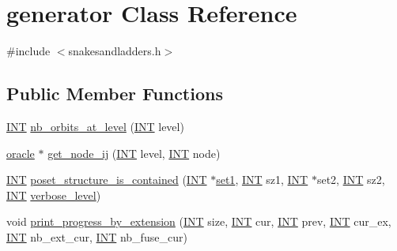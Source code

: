 \hypertarget{classgenerator}{}\section{generator Class Reference}
\label{classgenerator}


{\ttfamily \#include $<$snakesandladders.\+h$>$}

\subsection*{Public Member Functions}
\begin{DoxyCompactItemize}
\item 
\mbox{\hyperlink{galois_8h_a09fddde158a3a20bd2dcadb609de11dc}{I\+NT}} \mbox{\hyperlink{classgenerator_a020f3d8378448310d044a4a24fadf301}{nb\+\_\+orbits\+\_\+at\+\_\+level}} (\mbox{\hyperlink{galois_8h_a09fddde158a3a20bd2dcadb609de11dc}{I\+NT}} level)
\item 
\mbox{\hyperlink{classoracle}{oracle}} $\ast$ \mbox{\hyperlink{classgenerator_a8cea5411b42336694738530732ede540}{get\+\_\+node\+\_\+ij}} (\mbox{\hyperlink{galois_8h_a09fddde158a3a20bd2dcadb609de11dc}{I\+NT}} level, \mbox{\hyperlink{galois_8h_a09fddde158a3a20bd2dcadb609de11dc}{I\+NT}} node)
\item 
\mbox{\hyperlink{galois_8h_a09fddde158a3a20bd2dcadb609de11dc}{I\+NT}} \mbox{\hyperlink{classgenerator_a7744526e5820dc107488bbf0aa10a1db}{poset\+\_\+structure\+\_\+is\+\_\+contained}} (\mbox{\hyperlink{galois_8h_a09fddde158a3a20bd2dcadb609de11dc}{I\+NT}} $\ast$\mbox{\hyperlink{classgenerator_aab4d166b794b2fd14ba2176cd613d896}{set1}}, \mbox{\hyperlink{galois_8h_a09fddde158a3a20bd2dcadb609de11dc}{I\+NT}} sz1, \mbox{\hyperlink{galois_8h_a09fddde158a3a20bd2dcadb609de11dc}{I\+NT}} $\ast$set2, \mbox{\hyperlink{galois_8h_a09fddde158a3a20bd2dcadb609de11dc}{I\+NT}} sz2, \mbox{\hyperlink{galois_8h_a09fddde158a3a20bd2dcadb609de11dc}{I\+NT}} \mbox{\hyperlink{classgenerator_a7fedc6488314cbc00dbfcc42d311e1ce}{verbose\+\_\+level}})
\item 
void \mbox{\hyperlink{classgenerator_a027dc8a7d19a8bfd6cf3ecaab3878ec5}{print\+\_\+progress\+\_\+by\+\_\+extension}} (\mbox{\hyperlink{galois_8h_a09fddde158a3a20bd2dcadb609de11dc}{I\+NT}} size, \mbox{\hyperlink{galois_8h_a09fddde158a3a20bd2dcadb609de11dc}{I\+NT}} cur, \mbox{\hyperlink{galois_8h_a09fddde158a3a20bd2dcadb609de11dc}{I\+NT}} prev, \mbox{\hyperlink{galois_8h_a09fddde158a3a20bd2dcadb609de11dc}{I\+NT}} cur\+\_\+ex, \mbox{\hyperlink{galois_8h_a09fddde158a3a20bd2dcadb609de11dc}{I\+NT}} nb\+\_\+ext\+\_\+cur, \mbox{\hyperlink{galois_8h_a09fddde158a3a20bd2dcadb609de11dc}{I\+NT}} nb\+\_\+fuse\+\_\+cur)

\end{DoxyCompactItemize}
